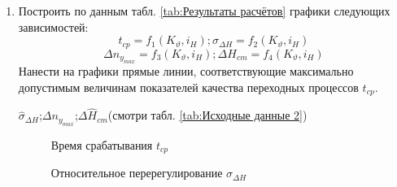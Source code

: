\documentclass[a4paper,12pt]{article}
\begin{document}
\begin{enumerate}
    \item Построить по данным табл. \ref{tab:Результаты расчётов} графики следующих зависимостей:
    $$t_{cp}=f_1(K_{\vartheta},i_H);\sigma_{\Delta H}=f_2(K_{\vartheta},i_H)$$
    $$\Delta n_{y_{max}}=f_3(K_{\vartheta},i_H);\Delta H_{cm}=f_4(K_{\vartheta},i_H)$$
    Нанести   на   графики   прямые   линии,   соответствующие   максимально допустимым величинам показателей качества переходных процессов  $t_{cp}$. 

    $\hat{\sigma}_{\Delta H}$;$\Delta n_{y_{max}}$;$\Delta \hat{H}_{cm}$(смотри табл. \ref{tab:Исходные данные 2})
    
    \begin{figure}[H]     %
        \caption{Время срабатывания $t_{cp}$}
        \label{fig:Время срабатывания}
    \end{figure}
    
    \begin{figure}[H]
        \caption{Относительное перерегулирование $\sigma_{\Delta H}$}
        \label{fig:Относительное перерегулирование}
    \end{figure}
    

\end{enumerate}
\end{document}

